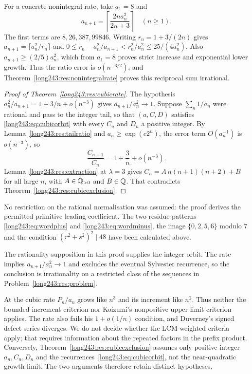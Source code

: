 \documentclass[11pt]{article}
\begin{document}
For a concrete nonintegral rate, take $a_1=8$ and
\[
 a_{n+1}=\left\lceil\frac{2n a_n^2}{2n+3}\right\rceil
 \quad(n\ge1).
\]
The first terms are $8,26,387,99846$. Writing
$r_n=1+3/(2n)$ gives $a_{n+1}=\lceil a_n^2/r_n\rceil$ and
$0\le r_n-a_n^2/a_{n+1}<r_n^2/a_n^2\le25/(4a_n^2)$.
Also $a_{n+1}\ge(2/5)a_n^2$, which from $a_1=8$ proves strict
increase and exponential lower growth. Thus the ratio error is
$o(n^{-3/2})$, and Theorem~\ref{long243:res:nonintegralrate}
proves this reciprocal sum irrational.

\begin{proof}[Proof of Theorem~\ref{long243:res:cubicrate}]
The hypothesis $a_n^2/a_{n+1}=1+3/n+o(n^{-3})$ gives $a_{n+1}/a_n^2\to1$.
Suppose $\sum_n1/a_n$ were rational and pass to the integer tail, so
that $(a,C,D)$ satisfies \eqref{long243:eq:cubicorbit} with every $C_n$ and $D_n$ a
positive integer.  By Lemma~\ref{long243:res:tailratio} and $a_n\ge\exp(c2^n)$, the
error term $O(a_n^{-1})$ is $o(n^{-3})$, so
\[
 \frac{C_{n+1}}{C_n}=1+\frac3n+o(n^{-3}).
\]
Lemma~\ref{long243:res:extraction} at $\lambda=3$ gives
$C_n=A\,n(n+1)(n+2)+B$ for all large $n$, with $A\in\mathbb{Q}_{>0}$ and $B\in\mathbb{Q}$.
That contradicts Theorem~\ref{long243:res:cubicexclusion}.
\end{proof}

No restriction on the rational normalisation was assumed: the proof
derives the permitted primitive leading coefficient. The two residue
patterns \eqref{long243:eq:wordplus} and \eqref{long243:eq:wordminus},
the image $\{0,2,5,6\}$ modulo $7$ and the condition
$(r^2+s^2)^2\mid48$ have been calculated above.

The rationality supposition in this proof supplies the integer orbit.
The rate implies $a_{n+1}/a_n^2\to1$ and excludes the eventual
Sylvester recurrence,
so the conclusion is irrationality on a restricted class of the sequences
in Problem~\ref{long243:res:problem}.

At the cubic rate $P_n/a_n$ grows like $n^3$ and its increment like
$n^2$.
Thus neither the bounded-increment criterion nor Koizumi's nonpositive
upper-limit criterion applies. The rate also fails his $1+o(1/n)$
condition, and Duverney's signed defect series diverges. We do not decide
whether the LCM-weighted criteria apply; that requires information about
the repeated factors in the prefix product. Conversely,
Theorem~\ref{long243:res:cubicexclusion} assumes only positive integer
$a_n,C_n,D_n$ and the recurrences~\eqref{long243:eq:cubicorbit}, not the
near-quadratic growth limit. The two arguments therefore retain distinct
hypotheses.
\end{document}
